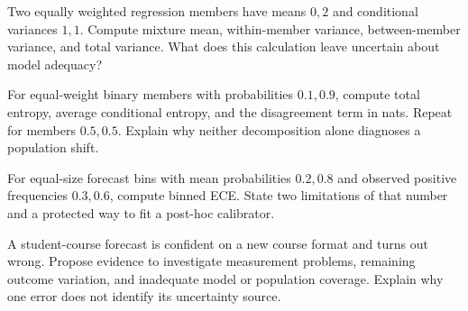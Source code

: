 \begin{exercises}
\item {}Two equally weighted regression members have means $0,2$ and conditional variances $1,1$. Compute mixture mean, within-member variance, between-member variance, and total variance. What does this calculation leave uncertain about model adequacy?
\item {}For equal-weight binary members with probabilities $0.1,0.9$, compute total entropy, average conditional entropy, and the disagreement term in nats. Repeat for members $0.5,0.5$. Explain why neither decomposition alone diagnoses a population shift.
\item {}For equal-size forecast bins with mean probabilities $0.2,0.8$ and observed positive frequencies $0.3,0.6$, compute binned ECE. State two limitations of that number and a protected way to fit a post-hoc calibrator.
\item {}A student-course forecast is confident on a new course format and turns out wrong. Propose evidence to investigate measurement problems, remaining outcome variation, and inadequate model or population coverage. Explain why one error does not identify its uncertainty source.
\end{exercises}

